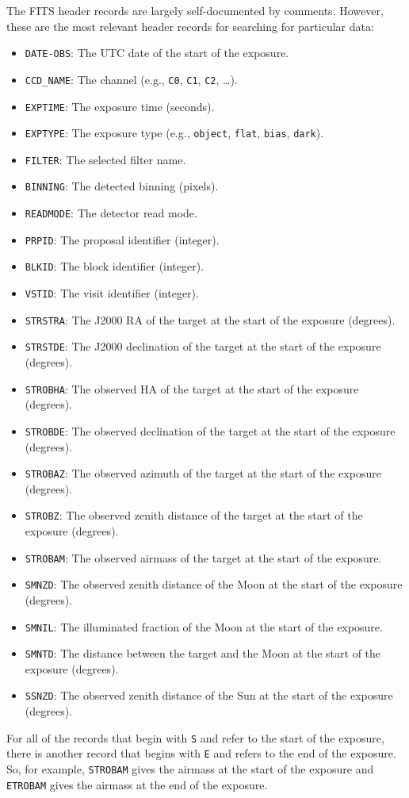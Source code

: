 The FITS header records are largely self-documented by comments. However, these are the most relevant header records for searching for particular data:

\begin{itemize}
\item \verb|DATE-OBS|: The UTC date of the start of the exposure.
\item \verb|CCD_NAME|: The channel (e.g., \verb|C0|, \verb|C1|, \verb|C2|, \ldots).
\item \verb|EXPTIME|: The exposure time (seconds).
\item \verb|EXPTYPE|: The exposure type (e.g., \verb|object|, \verb|flat|, \verb|bias|, \verb|dark|).
\item \verb|FILTER|: The selected filter name.
\item \verb|BINNING|: The detected binning (pixels).
\item \verb|READMODE|: The detector read mode.
\item \verb|PRPID|: The proposal identifier (integer).
\item \verb|BLKID|: The block identifier (integer).
\item \verb|VSTID|: The visit identifier (integer).
\item \verb|STRSTRA|: The J2000 RA of the target at the start of the exposure (degrees).
\item \verb|STRSTDE|: The J2000 declination of the target at the start of the exposure (degrees).
\item \verb|STROBHA|: The observed HA of the target at the start of the exposure (degrees).
\item \verb|STROBDE|: The observed declination of the target at the start of the exposure (degrees).
\item \verb|STROBAZ|: The observed azimuth of the target at the start of the exposure (degrees).
\item \verb|STROBZ|: The observed zenith distance of the target at the start of the exposure (degrees).
\item \verb|STROBAM|: The observed airmass of the target at the start of the exposure.
\item \verb|SMNZD|: The observed zenith distance of the Moon at the start of the exposure (degrees).
\item \verb|SMNIL|: The illuminated fraction of the Moon at the start of the exposure.
\item \verb|SMNTD|: The distance between the target and the Moon at the start of the exposure (degrees).
\item \verb|SSNZD|: The observed zenith distance of the Sun at the start of the exposure (degrees).
\end{itemize}
For all of the records that begin with \verb|S| and refer to the start of the exposure, there is another record that begins with \verb|E| and refers to the end of the exposure. So, for example, \verb|STROBAM| gives the airmass at the start of the exposure and \verb|ETROBAM| gives the airmass at the end of the exposure.

